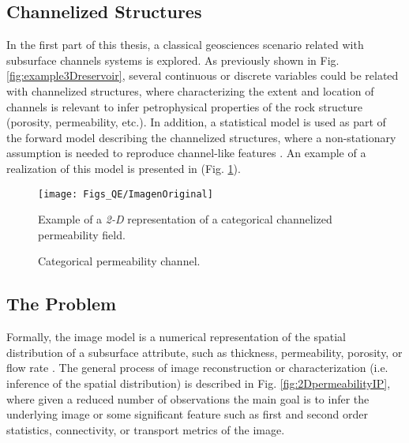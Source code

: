 \subsection{Channelized Structures}

In the first part of this thesis, a classical geosciences scenario related with subsurface channels systems is explored. As previously shown in Fig. \ref{fig:example3Dreservoir}, several continuous or discrete variables could be related with channelized structures, where characterizing the extent and location of channels is relevant to infer petrophysical properties of the rock structure (porosity, permeability, etc.). In addition, a statistical model is used as part of the forward model describing the channelized structures, where a non-stationary assumption is needed to reproduce channel-like features \citep{Oliver_2008_a,Remy_2009_a}. An example of a realization of this model is presented in (Fig. \ref{fig:2Dpermeabilityfield}). %

		\begin{figure}[H]
		\centering
		\texttt{[image: Figs\_QE/ImagenOriginal]}

		\caption{Categorical permeability channel.}
		\scriptsize{Example of a \emph{2-D} representation of a categorical channelized permeability field.}
		\label{fig:2Dpermeabilityfield}
		\end{figure}


\subsection{The Problem}

 Formally, the image model is a numerical representation of the spatial distribution of a subsurface  attribute, such as thickness, permeability, porosity, or flow rate \citep{kitanidis_1997_a, Lam_1983_a, Matheron_1971_a}. The general process of image reconstruction or characterization (i.e. inference of the spatial distribution) is described in Fig. \ref{fig:2DpermeabilityIP}, where given a reduced number of observations the main goal is to infer the underlying image or some significant feature such as first and second order statistics, connectivity, or transport metrics of the image.


